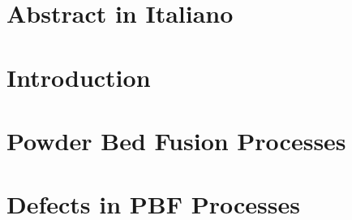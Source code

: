 \documentclass{Configuration_Files/PoliMi3i_thesis}
\begin{document}
\chapter*{Abstract in Italiano}




\thispagestyle{empty}
\tableofcontents %
\thispagestyle{empty}
\cleardoublepage


\mainmatter %



\chapter{Introduction}
\label{ch:Introduction}%



\chapter{Powder Bed Fusion Processes}
\label{ch:Metal_AM}



\chapter{Defects in PBF Processes}
\label{ch:defects}

\end{document}

